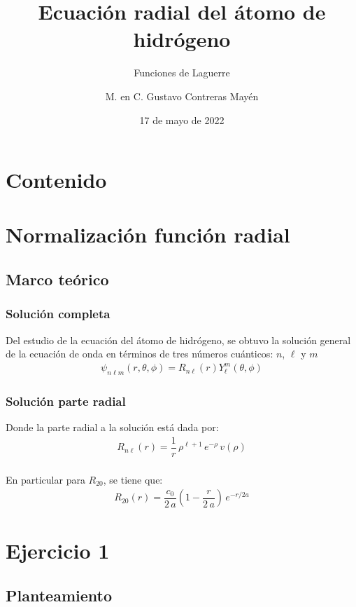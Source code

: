 \documentclass[12pt]{beamer}
\date{17 de mayo de 2022}
\title{\large{Ecuación radial del átomo de hidrógeno}}
\subtitle{Funciones de Laguerre}
\author{M. en C. Gustavo Contreras Mayén}
\begin{document}
\maketitle
\fontsize{14}{14}\selectfont
{}

\section*{Contenido}

\section{Normalización función radial}
\subsection{Marco teórico}

\begin{frame}
\frametitle{Solución completa}
Del estudio de la ecuación del átomo de hidrógeno, se obtuvo la solución general de la ecuación de onda en términos de tres números cuánticos: $n$, $\ell$ y $m$
\begin{align*}
\psi_{n \ell m} (r, \theta, \phi) =  R_{n \ell} (r) Y_{\ell}^{m} (\theta, \phi)
\end{align*}
\end{frame}
\begin{frame}
\frametitle{Solución parte radial}
Donde la parte radial a la solución está dada por:
\begin{align*}
R_{n \ell}(r) = \dfrac{1}{r} \, \rho^{\ell + 1} \, e^{-\rho} \, v(\rho)
\end{align*}
\\
\bigskip
\pause
En particular para $R_{20}$, se tiene que:
\begin{align*}
R_{20}(r) = \dfrac{c_{0}}{2 \, a} \left( 1 - \dfrac{r}{2 \, a} \right) \, e^{-r/2a}
\end{align*}
\end{frame}

\section{Ejercicio 1}
\subsection{Planteamiento}
\end{document}
